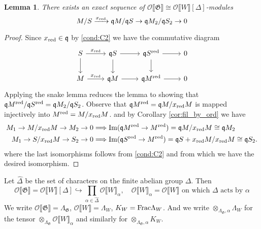 \documentclass[leqno]{amsart}
\newtheorem{lem}[thm]{Lemma}
\theoremstyle{definition}
\theoremstyle{remark}
\newcommand{\oo}{\mathcal{O}}
\DeclareMathOperator{\Image}{Im}
\newcommand{\fq}{\mathfrak{q}}
\newcommand{\red}{\textnormal{red}}
\newcommand{\xx}{x_\textnormal{red}}
\newcommand{\fG}{\mathfrak{G}}
\begin{document}
\begin{lem}\label{lem:right_exact}
There exists an exact sequence
of $\oo\llbracket\fG\rrbracket\cong
\oo\llbracket W\rrbracket[\Delta]$-modules
\begin{equation}\label{eq:fund}
	M/S\xrightarrow{\xx} \fq M/\fq S\to 
	\fq M_2/\fq S_2 \to 0
\end{equation}
\end{lem}

\begin{proof}
Since $\xx\in \fq$ by \ref{cond:C2}
we have the commutative diagram
\[
\begin{tikzcd}
	S\arrow[r,"\xx"] \arrow[d]
	& \fq S \arrow[r] \arrow[d]
	& \fq S^{\red} \arrow[r] \arrow[d] & 0\\
	M\arrow[r,"\xx"]
	& \fq M \arrow[r]
	& \fq M^{\red} \arrow[r] & 0
\end{tikzcd}
\]
Applying the snake lemma
reduces the lemma to showing that
$\fq M^{\red}/\fq S^{\red}=\fq M_2/\fq S_2$.
Observe that $\fq M^{\red}=\fq M/\xx M$ 
is mapped injectively into $M^{\red}=M/\xx M$.
and by Corollary \ref{cor:fil_by_ord} we have
\begin{align*}
    M_1\to M/\xx M\to M_2\to 0
    &\Longrightarrow
	\Image(\fq M^{\red}\to M^{\red})=
    \fq M/\xx M\cong\fq M_2\\
    M_1\to S/\xx M\to S_2\to 0
    &\Longrightarrow
	\Image(\fq S^{\red}\to M^{\red})=
    \fq S+\xx M/\xx M\cong\fq S_2.
\end{align*}
where the last isomorphisms 
follows from \ref{cond:C2}
and from which we have the desired isomorphism.
\end{proof}


Let $\hat{\Delta}$ be the set 
of characters on the finite abelian group $\Delta$. Then
\[
    \oo\llbracket\fG\rrbracket=
    \oo\llbracket W\rrbracket[\Delta]\hookrightarrow
    \prod_{\alpha\in\hat{\Delta}}
    \oo\llbracket W\rrbracket_\alpha,\quad
    \oo\llbracket W\rrbracket_\alpha=
    \oo\llbracket W\rrbracket
    \text{ on which $\Delta$ acts by $\alpha$}
\]
We write 
$\oo\llbracket\fG\rrbracket=\Lambda_\fG$, 
$\oo\llbracket W\rrbracket=\Lambda_W$,
$K_W=\textnormal{Frac}\Lambda_W$.
And we write $\otimes_{\Lambda_\fG,\alpha}\Lambda_W$
for the tensor $\otimes_{\Lambda_\fG}\oo\llbracket W\rrbracket_\alpha$
and similarly for $\otimes_{\Lambda_\fG,\alpha}K_W$.
\end{document}
